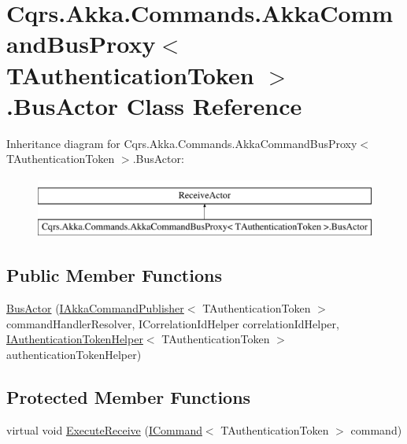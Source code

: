 \hypertarget{classCqrs_1_1Akka_1_1Commands_1_1AkkaCommandBusProxy_1_1BusActor}{}\section{Cqrs.\+Akka.\+Commands.\+Akka\+Command\+Bus\+Proxy$<$ T\+Authentication\+Token $>$.Bus\+Actor Class Reference}
\label{classCqrs_1_1Akka_1_1Commands_1_1AkkaCommandBusProxy_1_1BusActor}
Inheritance diagram for Cqrs.\+Akka.\+Commands.\+Akka\+Command\+Bus\+Proxy$<$ T\+Authentication\+Token $>$.Bus\+Actor\+:\begin{figure}[H]
\begin{center}
\leavevmode
\includegraphics[height=2.000000cm]{classCqrs_1_1Akka_1_1Commands_1_1AkkaCommandBusProxy_1_1BusActor}
\end{center}
\end{figure}
\subsection*{Public Member Functions}
\begin{DoxyCompactItemize}
\item 
\hyperlink{classCqrs_1_1Akka_1_1Commands_1_1AkkaCommandBusProxy_1_1BusActor_a5ddecec1b6333aaf89dbff824cf6ddd2_a5ddecec1b6333aaf89dbff824cf6ddd2}{Bus\+Actor} (\hyperlink{interfaceCqrs_1_1Akka_1_1Commands_1_1IAkkaCommandPublisher}{I\+Akka\+Command\+Publisher}$<$ T\+Authentication\+Token $>$ command\+Handler\+Resolver, I\+Correlation\+Id\+Helper correlation\+Id\+Helper, \hyperlink{interfaceCqrs_1_1Authentication_1_1IAuthenticationTokenHelper}{I\+Authentication\+Token\+Helper}$<$ T\+Authentication\+Token $>$ authentication\+Token\+Helper)
\end{DoxyCompactItemize}
\subsection*{Protected Member Functions}
\begin{DoxyCompactItemize}
\item 
virtual void \hyperlink{classCqrs_1_1Akka_1_1Commands_1_1AkkaCommandBusProxy_1_1BusActor_a2218f176012e4074308d8de36f1f48a2_a2218f176012e4074308d8de36f1f48a2}{Execute\+Receive} (\hyperlink{interfaceCqrs_1_1Commands_1_1ICommand}{I\+Command}$<$ T\+Authentication\+Token $>$ command)
\end{DoxyCompactItemize}
